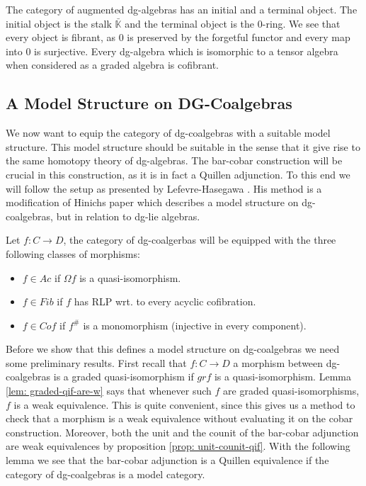 \documentclass[../thesis.tex]{subfiles}
\begin{document}
            The category of augmented dg-algebras has an initial and a terminal object. The initial object is the stalk $\bar{\mathbb{K}}$ and the terminal object is the $0$-ring. We see that every object is fibrant, as $0$ is preserved by the forgetful functor and every map into $0$ is surjective. Every dg-algebra which is isomorphic to a tensor algebra when considered as a graded algebra is cofibrant.
            
    \subsection{A Model Structure on DG-Coalgebras}

            We now want to equip the category of dg-coalgebras with a suitable model structure. This model structure should be suitable in the sense that it give rise to the same homotopy theory of dg-algebras. The bar-cobar construction will be crucial in this construction, as it is in fact a Quillen adjunction. To this end we will follow the setup as presented by Lefevre-Hasegawa \cite{LefevreHasegawa03}. His method is a modification of Hinichs paper \cite{Hinich01} which describes a model structure on dg-coalgebras, but in relation to dg-lie algebras.

            Let $f: C \rightarrow D$, the category of dg-coalgerbas will be equipped with the three following classes of morphisms:
            \begin{itemize}
                \item $f\in Ac$ if $\Omega f$ is a quasi-isomorphism.
                \item $f\in Fib$ if $f$ has RLP wrt. to every acyclic cofibration.
                \item $f\in Cof$ if $f^\#$ is a monomorphism (injective in every component).
            \end{itemize}

            Before we show that this defines a model structure on dg-coalgebras we need some preliminary results. First recall that $f : C \rightarrow D$ a morphism between dg-coalgebras is a graded quasi-isomorphism if $grf$ is a quasi-isomorphism. Lemma \ref{lem: graded-qif-are-w} says that whenever such $f$ are graded quasi-isomorphisms, $f$ is a weak equivalence. This is quite convenient, since this gives us a method to check that a morphism is a weak equivalence without evaluating it on the cobar construction. Moreover, both the unit and the counit of the bar-cobar adjunction are weak equivalences by proposition \ref{prop: unit-counit-qif}. With the following lemma we see that the bar-cobar adjunction is a Quillen equivalence if the category of dg-coalgebras is a model category.
\end{document}
